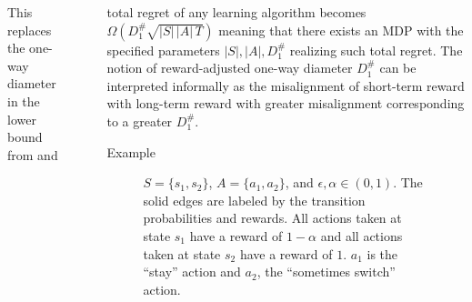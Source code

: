 \documentclass[final]{beamer}
\newlength{\sepwidth}
\newlength{\colwidth}
\newcommand{\separatorcolumn}{\begin{column}{\sepwidth}\end{column}}
\begin{document}
\begin{frame}[t]
\begin{columns}[t]
\begin{column}{\colwidth}
  This replaces the one-way diameter in the lower bound from \cite{bartlett2009regal} and 

\end{column}

\separatorcolumn

\begin{column}{\colwidth}

  total regret of any learning algorithm becomes $\Omega(D_1^\#\sqrt{|S|\,|A|\,T})$ meaning that there exists an MDP with the specified parameters $|S|, |A|, D_1^\#$ realizing such total regret. The notion of reward-adjusted one-way diameter $D_1^\#$ can be interpreted informally as the misalignment of short-term reward with long-term reward with greater misalignment corresponding to a greater $D_1^\#$. 

  \begin{block}{Example}
    
    \begin{figure}[h]
    \centering
    \caption{$S = \{s_1, s_2\}$, $A = \{a_1, a_2\}$, and $\epsilon, \alpha \in (0, 1)$. The solid edges are labeled by the transition probabilities and rewards. All actions taken at state $s_1$ have a reward of $1-\alpha$ and all actions taken at state $s_2$ have a reward of $1$. $a_1$ is the ``stay'' action and $a_2$, the ``sometimes switch'' action.}
  \end{figure}
  

\end{block}
\end{column}
\end{columns}
\end{frame}
\end{document}
